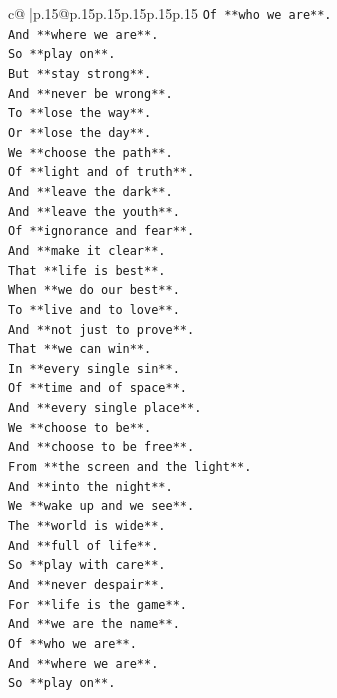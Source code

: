 \documentclass{article}
\begin{document}
{\begin{supertabular}{c@{$\;$}|p{.15\linewidth}@{}p{.15\linewidth}p{.15\linewidth}p{.15\linewidth}p{.15\linewidth}p{.15\linewidth}}
{{{\texttt{Of **who we are**.} \\
\texttt{And **where we are**.} \\
\texttt{So **play on**.} \\
\texttt{But **stay strong**.} \\
\texttt{And **never be wrong**.} \\
\texttt{To **lose the way**.} \\
\texttt{Or **lose the day**.} \\
\texttt{We **choose the path**.} \\
\texttt{Of **light and of truth**.} \\
\texttt{And **leave the dark**.} \\
\texttt{And **leave the youth**.} \\
\texttt{Of **ignorance and fear**.} \\
\texttt{And **make it clear**.} \\
\texttt{That **life is best**.} \\
\texttt{When **we do our best**.} \\
\texttt{To **live and to love**.} \\
\texttt{And **not just to prove**.} \\
\texttt{That **we can win**.} \\
\texttt{In **every single sin**.} \\
\texttt{Of **time and of space**.} \\
\texttt{And **every single place**.} \\
\texttt{We **choose to be**.} \\
\texttt{And **choose to be free**.} \\
\texttt{From **the screen and the light**.} \\
\texttt{And **into the night**.} \\
\texttt{We **wake up and we see**.} \\
\texttt{The **world is wide**.} \\
\texttt{And **full of life**.} \\
\texttt{So **play with care**.} \\
\texttt{And **never despair**.} \\
\texttt{For **life is the game**.} \\
\texttt{And **we are the name**.} \\
\texttt{Of **who we are**.} \\
\texttt{And **where we are**.} \\
\texttt{So **play on**.} \\
}}}
\end{supertabular}}
\end{document}
